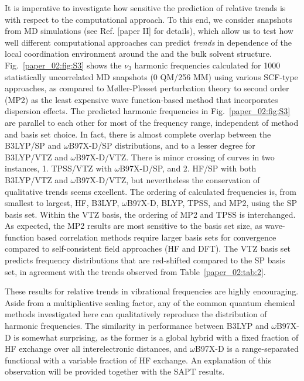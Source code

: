 It is imperative to investigate how sensitive the prediction of relative trends is with respect to the computational approach. To this end, we consider snapshots from MD simulations (see Ref. {[}paper II{]} for details), which allow us to test how well different computational approaches can predict \emph{trends} in dependence of the local coordination environment around the  and the bulk solvent structure. Fig.~\ref{paper_02:fig:S3} shows the  \(\nu_{3}\) harmonic frequencies calculated for \num{1000} statistically uncorrelated MD snapshots (0 QM/256 MM) using various SCF-type approaches, as compared to Møller-Plesset perturbation theory to second order (MP2) as the least expensive wave function-based method that incorporates dispersion effects.\cite{47} The predicted harmonic frequencies in Fig.~\ref{paper_02:fig:S3} are parallel to each other for most of the frequency range, independent of method and basis set choice. In fact, there is almost complete overlap between the B3LYP/SP and \(\omega\)B97X-D/SP distributions, and to a lesser degree for B3LYP/VTZ and \(\omega\)B97X-D/VTZ. There is minor crossing of curves in two instances, 1. TPSS/VTZ with \(\omega\)B97X-D/SP, and 2. HF/SP with both B3LYP/VTZ and \(\omega\)B97X-D/VTZ, but nevertheless the conservation of qualitative trends seems excellent. The ordering of calculated frequencies is, from smallest to largest, HF, B3LYP, \(\omega\)B97X-D, BLYP, TPSS, and MP2, using the SP basis set. Within the VTZ basis, the ordering of MP2 and TPSS is interchanged. As expected, the MP2 results are most sensitive to the basis set size, as wave-function based correlation methods require larger basis sets for convergence compared to self-consistent field approaches (HF and DFT). The VTZ basis set predicts frequency distributions that are red-shifted compared to the SP basis set, in agreement with the trends observed from Table~\ref{paper_02:tab:2}.

These results for relative trends in vibrational frequencies are highly encouraging. Aside from a multiplicative scaling factor, any of the common quantum chemical methods investigated here can qualitatively reproduce the distribution of harmonic frequencies. The similarity in performance between B3LYP and \(\omega\)B97X-D is somewhat surprising, as the former is a global hybrid with a fixed fraction of HF exchange over all interelectronic distances, and \(\omega\)B97X-D is a range-separated functional with a variable fraction of HF exchange. An explanation of this observation will be provided together with the SAPT results.

